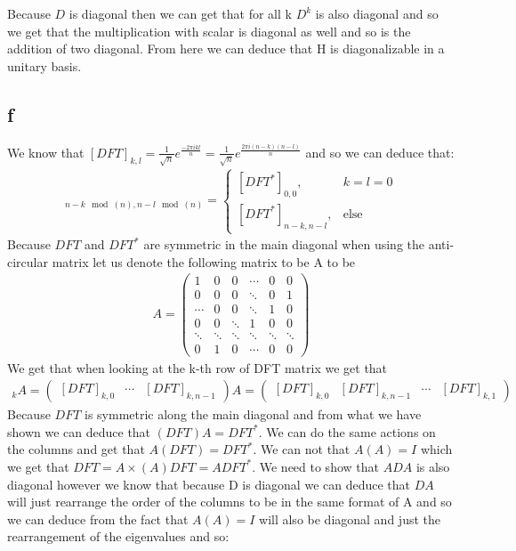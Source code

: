 \documentclass[english]{extarticle}
\numberwithin{equation}{section}
\numberwithin{figure}{section}
\begin{document}
Because $D$ is diagonal then we can get that for all k $D^{k}$ is also diagonal and so we get that the multiplication with scalar is diagonal as well and so is the addition of two diagonal. From here we can deduce that H is diagonalizable in a unitary basis.
\subsection*{f}
We know that $[DFT]_{k,l} = \frac{1}{\sqrt{n}}e^{\frac{-2 \pi i k l}{n}} = \frac{1}{\sqrt{n}}e^{\frac{2 \pi i (n-k)(n-l)}{n}}$ and so we can deduce that:
\begin{align}
    [DFT^{*}]_{n-k\mod(n),n-l\mod(n)} = \begin{cases}
            [DFT^{*}]_{0,0}, & \text{$k=l=0$}\\
             [DFT^{*}]_{n-k,n-l}, & \text{else}
		 \end{cases}
\end{align}
Because $DFT$ and $DFT^{*}$ are symmetric in the main diagonal when using the anti-circular matrix let us denote the following matrix to be A to be
\begin{align}
    A = \begin{pmatrix} 1 & 0 & 0 & \cdots & 0 & 0\\ 0 & 0 & 0 & \ddots & 0 & 1 \\
    \cdots & 0 & 0 & \ddots & 1 & 0 \\ 0 & 0 & \ddots & 1 & 0 & 0 \\ \ddots & \ddots & \ddots & \ddots & \ddots & \ddots \\ 0 & 1 & 0 & \cdots & 0 & 0\end{pmatrix}
\end{align}
We get that when looking at the k-th row of DFT matrix we get that
\begin{align}
    [DFT]_{k}A = \begin{pmatrix} [DFT]_{k,0} & \cdots & [DFT]_{k,n-1} \end{pmatrix}A= \begin{pmatrix}
        [DFT]_{k,0} & [DFT]_{k,n-1} &  \cdots & [DFT]_{k,1}
    \end{pmatrix}
\end{align}
Because $DFT$ is symmetric along the main diagonal and from what we have shown we can deduce that $(DFT)A = DFT^{*}$. We can do the same actions on the columns and get that $A(DFT) = DFT^{*}$. We can not that $A(A) = I$  which we get that $DFT = A \times (A) DFT = A DFT^{*}$. We need to show that $A D A$ is also diagonal however we know that because D is diagonal we can deduce that $DA$ will just rearrange the order of the columns to be in the same format of A and so we can deduce from the fact that $A(A) = I$ will also be diagonal and just the rearrangement of the eigenvalues and so:
\end{document}
